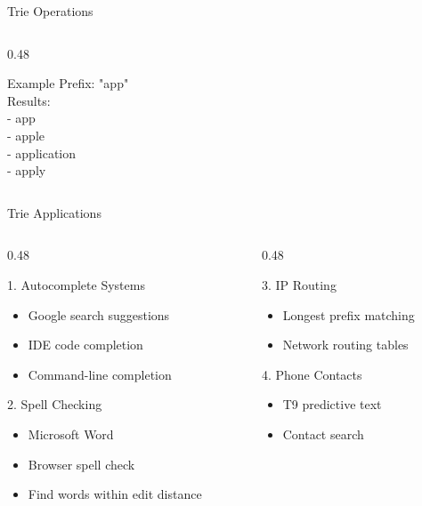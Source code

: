 \documentclass[aspectratio=169,xcolor=dvipsnames]{beamer}
\begin{document}
\begin{frame}{Trie Operations}
\begin{columns}
\begin{column}{0.48\textwidth}
      \begin{exampleblock}{Example}
        Prefix: "app" \\
        Results: \\
        - app \\
        - apple \\
        - application \\
        - apply
      \end{exampleblock}
    \end{column}
  \end{columns}
\end{frame}

\begin{frame}{Trie Applications}
  \begin{columns}
    \begin{column}{0.48\textwidth}
      \begin{block}{1. Autocomplete Systems}
        \begin{itemize}
          \item Google search suggestions
          \item IDE code completion
          \item Command-line completion
        \end{itemize}
      \end{block}

      \begin{block}{2. Spell Checking}
        \begin{itemize}
          \item Microsoft Word
          \item Browser spell check
          \item Find words within edit distance
        \end{itemize}
      \end{block}
    \end{column}
    \begin{column}{0.48\textwidth}
      \begin{block}{3. IP Routing}
        \begin{itemize}
          \item Longest prefix matching
          \item Network routing tables
        \end{itemize}
      \end{block}

      \begin{block}{4. Phone Contacts}
        \begin{itemize}
          \item T9 predictive text
          \item Contact search
        \end{itemize}
      \end{block}
    \end{column}
  \end{columns}


\end{frame}
\end{document}
